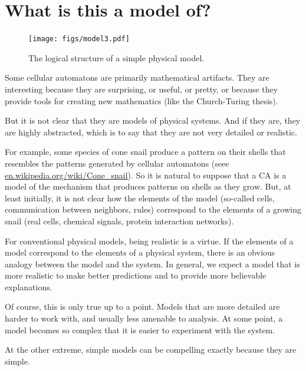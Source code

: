 \documentclass[12pt]{book}
\theoremstyle{exercise}
\begin{document}
\section{What is this a model of?}
\label{model3}

\begin{figure}
\centerline{\texttt{[image: figs/model3.pdf]}}
\caption{The logical structure of a simple physical model.}
\label{fig.model3}
\end{figure}

Some cellular automatons are primarily mathematical artifacts.  They are
interesting because they are surprising, or useful, or pretty, or
because they provide tools for creating new mathematics (like the
Church-Turing thesis).


But it is not clear that they are models of physical systems.  And if
they are, they are highly abstracted, which is to say that they are
not very detailed or realistic.


For example, some species of cone snail produce a pattern on their
shells that resembles the patterns generated by cellular automatons
(seee \url{en.wikipedia.org/wiki/Cone_snail}).  So it is natural to
suppose that a CA is a model of the mechanism that produces patterns
on shells as they grow.  But, at least initially, it is not clear how
the elements of the model (so-called cells, communication between
neighbors, rules) correspond to the elements of a growing snail (real
cells, chemical signals, protein interaction networks).


For conventional physical models, being realistic is a virtue.  If the elements of a model correspond to the elements of a physical system, there is an obvious analogy between the
model and the system.  In general, we expect a model that is more
realistic to make better predictions and to provide more believable
explanations.


Of course, this is only true up to a point.  Models that are
more detailed are harder to work with, and usually less
amenable to analysis.  At some point, a model becomes so complex
that it is easier to experiment with the system.

At the other extreme, simple models can be compelling exactly because
they are simple.
\end{document}

